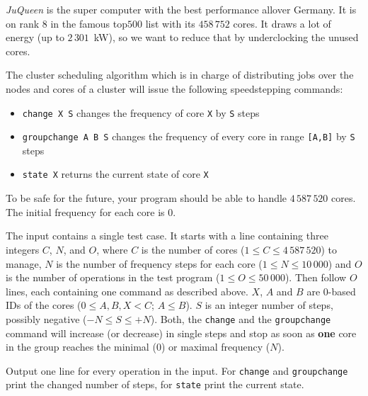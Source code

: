 \emph{JuQueen} is the super computer with the best performance allover Germany.
It is on rank $8$ in the famous top$500$ list with its $458\,752$ cores.
It draws a lot of energy (up to $2\,301$~kW), so we want to reduce that by underclocking the unused cores.

The cluster scheduling algorithm which is in charge of distributing jobs over the nodes and cores of a cluster will issue the following speedstepping commands:
\begin{itemize}
	\item \texttt{change X S} changes the frequency of core \texttt{X} by \texttt{S} steps
	\item \texttt{groupchange A B S} changes the frequency of every core in range \texttt{[A,B]} by \texttt{S} steps
	\item \texttt{state X} returns the current state of core \texttt{X}
\end{itemize}
To be safe for the future, your program should be able to handle $4\,587\,520$ cores.
The initial frequency for each core is $0$.

\begin{Input}
    The input contains a single test case.
    It starts with a line containing three integers $C$, $N$, and $O$,
    where $C$ is the number of cores ($1 \leq C \leq 4\,587\,520$) to manage, $N$ is the number of frequency steps for each core ($1 \leq N \leq 10\,000$) and $O$ is the number of operations in the test program ($1 \leq O \leq 50\,000$).
    Then follow $O$ lines, each containing one command as described above.
    $X$, $A$ and $B$ are $0$-based IDs of the cores ($0 \leq A, B, X < C$; $A \leq B$).
    $S$ is an integer number of steps, possibly negative ($-N \leq S \leq +N$).
    Both, the \texttt{change} and the \texttt{groupchange} command will increase (or decrease) in single steps and stop as soon as \textbf{one} core in the group reaches the minimal ($0$) or maximal frequency ($N$).
\end{Input}

\begin{Output}
    Output one line for every operation in the input.
    For \texttt{change} and \texttt{groupchange} print the changed
    number of steps, for \texttt{state} print the current state.
\end{Output}
